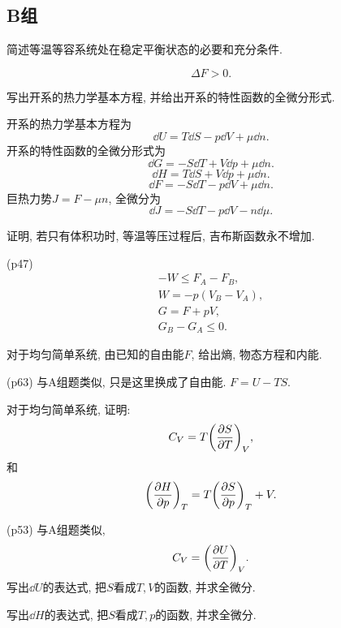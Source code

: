 \subsection{B组}
\begin{questions}
  \question 简述等温等容系统处在稳定平衡状态的必要和充分条件.
  \begin{solution}
    \begin{equation}
      \Delta F > 0.
    \end{equation}
  \end{solution}
  \question 写出开系的热力学基本方程, 并给出开系的特性函数的全微分形式.
  \begin{solution}
    开系的热力学基本方程为
    \begin{equation}
      \dd U = T\dd S - p\dd V + \mu\dd n.
    \end{equation}
    开系的特性函数的全微分形式为
    \begin{equation}
      \dd G = -S\dd T + V\dd p +\mu\dd n.
    \end{equation}
    \begin{equation}
      \dd H = T\dd S + V\dd p + \mu\dd n.
    \end{equation}
    \begin{equation}
      \dd F = -S\dd T - p\dd V + \mu\dd n.
    \end{equation}
    巨热力势$J=F-\mu n$, 全微分为
    \begin{equation}
      \dd J = -S\dd T - p\dd V - n\dd \mu.
    \end{equation}
  \end{solution}
  \question 证明, 若只有体积功时, 等温等压过程后, 吉布斯函数永不增加.
  \begin{solution}
(p47)
\begin{gather}
  -W \le F_A - F_B,\\
  W = -p(V_B-V_A),\\
  G = F+pV,\\
  G_B-G_A\le 0.
\end{gather}
  \end{solution}

  \question 对于均匀简单系统, 由已知的自由能$F$, 给出熵, 物态方程和内能.
  \begin{solution}
(p63) 与A组题类似, 只是这里换成了自由能. $F = U-TS$.
  \end{solution}
  \question 对于均匀简单系统, 证明:
  \begin{equation}
    C_V = T\qty(\pdv{S}{T})_V,
  \end{equation}
  和
  \begin{equation}
    \qty(\pdv{H}{p})_T = T\qty(\pdv{S}{p})_T + V.
  \end{equation}

  \begin{solution}
(p53) 与A组题类似,
\begin{equation}
  C_V = \qty(\pdv{U}{T})_V.
\end{equation}
写出$\dd U$的表达式, 把$S$看成$T,V$的函数, 并求全微分.

写出$\dd H$的表达式, 把$S$看成$T,p$的函数, 并求全微分.
  \end{solution}
\end{questions}